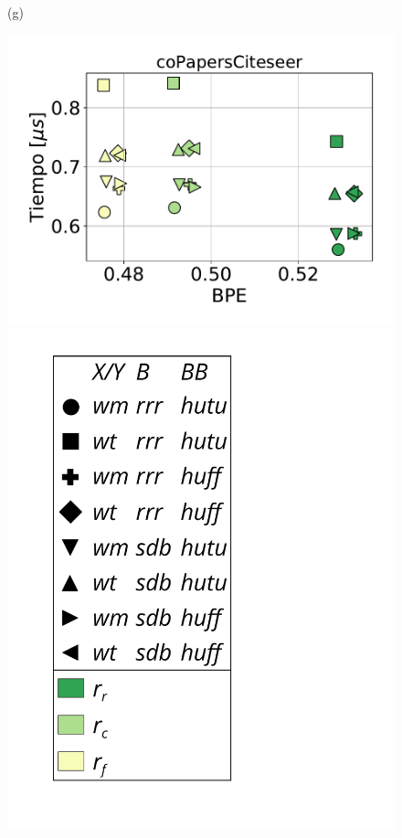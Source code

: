 \begin{figure}
\begin{minipage}{1\textwidth}
\begin{minipage}{0.45\textwidth}
    			(g)
    		\end{minipage}
    		\begin{minipage}{0.45\textwidth}
    			\centering
    			\begin{minipage}{0.75\textwidth}
    				\centering
    				\includegraphics[width=1\linewidth]{img/sdsl/secuencial/coPapersCiteseer.pdf}
    			\end{minipage}
    			\begin{minipage}{0.2\textwidth}
    				\centering
    				\includegraphics[scale=.16, clip, trim=70 0 0 0]{img/sdsl/label.pdf}

\end{minipage}
\end{minipage}
\end{minipage}
\end{figure}
